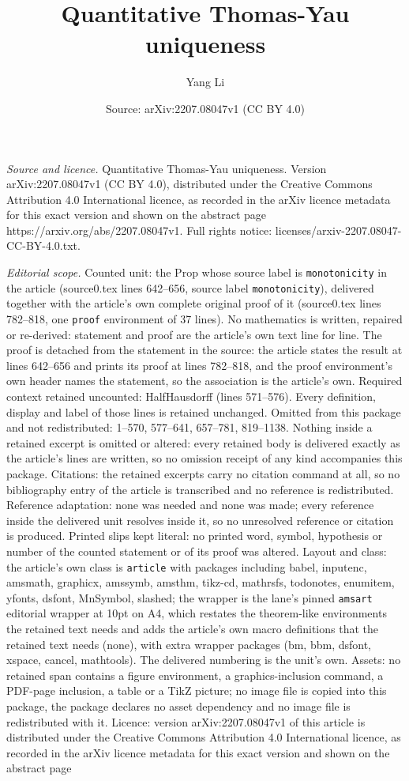\documentclass[10pt,a4paper]{amsart}
\title[Quantitative Thomas-Yau uniqueness]{Quantitative Thomas-Yau uniqueness}
\author{Yang Li}
\date{Source: arXiv:2207.08047v1 (CC BY 4.0)}
\begin{document}
\maketitle

\noindent\emph{Source and licence.} Quantitative Thomas-Yau uniqueness. Version arXiv:2207.08047v1 (CC BY 4.0), distributed under the Creative Commons Attribution 4.0 International licence, as recorded in the arXiv licence metadata for this exact version and shown on the abstract page https://arxiv.org/abs/2207.08047v1. Full rights notice: licenses/arxiv-2207.08047-CC-BY-4.0.txt.\par\smallskip

\noindent\textit{Editorial scope.} Counted unit: the Prop whose source label is \texttt{monotonicity} in the article (source0.tex lines 642--656, source label \texttt{monotonicity}), delivered together with the article's own complete original proof of it (source0.tex lines 782--818, one \texttt{proof} environment of 37 lines). No mathematics is written, repaired or re-derived: statement and proof are the article's own text line for line. The proof is detached from the statement in the source: the article states the result at lines 642--656 and prints its proof at lines 782--818, and the proof environment's own header names the statement, so the association is the article's own. Required context retained uncounted: HalfHausdorff (lines 571--576). Every definition, display and label of those lines is retained unchanged. Omitted from this package and not redistributed: 1--570, 577--641, 657--781, 819--1138. Nothing inside a retained excerpt is omitted or altered: every retained body is delivered exactly as the article's lines are written, so no omission receipt of any kind accompanies this package. Citations: the retained excerpts carry no citation command at all, so no bibliography entry of the article is transcribed and no reference is redistributed. Reference adaptation: none was needed and none was made; every reference inside the delivered unit resolves inside it, so no unresolved reference or citation is produced. Printed slips kept literal: no printed word, symbol, hypothesis or number of the counted statement or of its proof was altered. Layout and class: the article's own class is \texttt{article} with packages including babel, inputenc, amsmath, graphicx, amssymb, amsthm, tikz-cd, mathrsfs, todonotes, enumitem, yfonts, dsfont, MnSymbol, slashed; the wrapper is the lane's pinned \texttt{amsart} editorial wrapper at 10pt on A4, which restates the theorem-like environments the retained text needs and adds the article's own macro definitions that the retained text needs (none), with extra wrapper packages (bm, bbm, dsfont, xspace, cancel, mathtools). The delivered numbering is the unit's own. Assets: no retained span contains a figure environment, a graphics-inclusion command, a PDF-page inclusion, a table or a TikZ picture; no image file is copied into this package, the package declares no asset dependency and no image file is redistributed with it. Licence: version arXiv:2207.08047v1 of this article is distributed under the Creative Commons Attribution 4.0 International licence, as recorded in the arXiv licence metadata for this exact version and shown on the abstract page 
\end{document}
